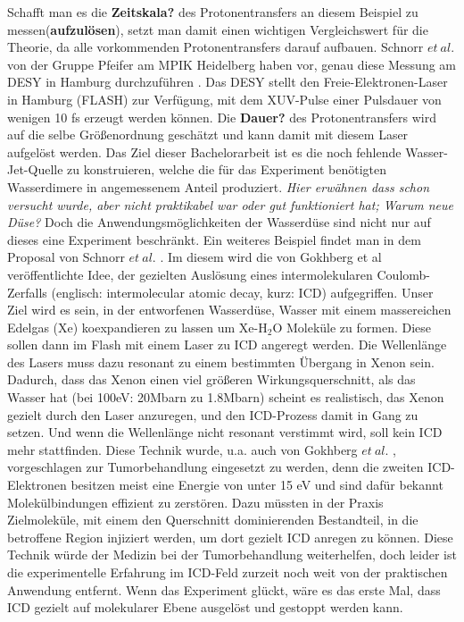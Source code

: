   Schafft man es die \textbf{Zeitskala?} des Protonentransfers an diesem Beispiel zu messen(\textbf{aufzulösen}), setzt man damit einen wichtigen Vergleichswert für die Theorie, da alle vorkommenden Protonentransfers darauf aufbauen. Schnorr $et\ al.$ von der Gruppe Pfeifer am MPIK Heidelberg haben vor, genau diese Messung am DESY in Hamburg durchzuführen \cite{SchPTD15}. Das DESY stellt den Freie-Elektronen-Laser in Hamburg (FLASH) zur Verfügung, mit dem XUV-Pulse einer Pulsdauer von wenigen 10 fs erzeugt werden können. Die \textbf{Dauer?} des Protonentransfers wird auf die selbe Größenordnung geschätzt und kann damit mit diesem Laser aufgelöst werden.
  Das Ziel dieser Bachelorarbeit ist es die noch fehlende Wasser-Jet-Quelle zu konstruieren, welche die für das Experiment benötigten Wasserdimere in angemessenem Anteil produziert. 
  \textit{Hier erwähnen dass schon versucht wurde, aber nicht praktikabel war oder gut funktioniert hat; Warum neue Düse?}
  Doch die Anwendungsmöglichkeiten der Wasserdüse sind nicht nur auf dieses eine Experiment beschränkt. Ein weiteres Beispiel findet man in dem Proposal von Schnorr $et\ al.$ \cite{SchICD15}. Im diesem wird die von Gokhberg et al \cite{gokhberg2014} veröffentlichte Idee, der gezielten Auslösung eines intermolekularen Coulomb-Zerfalls (englisch: intermolecular atomic decay, kurz: ICD) aufgegriffen. Unser Ziel wird es sein, in der entworfenen Wasserdüse, Wasser mit einem massereichen Edelgas (Xe) koexpandieren zu lassen um Xe-H$_2$O Moleküle zu formen. Diese sollen dann im Flash mit einem Laser zu ICD angeregt werden. Die Wellenlänge des Lasers muss dazu resonant zu einem bestimmten Übergang in Xenon sein. Dadurch, dass das Xenon einen viel größeren Wirkungsquerschnitt, als das Wasser hat (bei 100eV: 20Mbarn zu 1.8Mbarn) scheint es realistisch, das Xenon gezielt durch den Laser anzuregen, und den ICD-Prozess damit in Gang zu setzen. Und wenn die Wellenlänge nicht resonant verstimmt wird, soll kein ICD mehr stattfinden. Diese Technik wurde, u.a. auch von Gokhberg $et\ al.$ \cite{gokhberg2014}, vorgeschlagen zur Tumorbehandlung eingesetzt zu werden, denn die zweiten ICD-Elektronen besitzen meist eine Energie von unter 15 eV und sind dafür bekannt Molekülbindungen effizient zu zerstören.  Dazu müssten in der Praxis Zielmoleküle, mit einem den Querschnitt dominierenden Bestandteil, in die betroffene Region injiziert werden, um dort gezielt ICD anregen zu können. 
  Diese Technik würde der Medizin bei der Tumorbehandlung weiterhelfen, doch leider ist die experimentelle Erfahrung im ICD-Feld zurzeit noch weit von der praktischen Anwendung entfernt. Wenn das Experiment glückt, wäre es das erste Mal, dass ICD gezielt auf molekularer Ebene ausgelöst und gestoppt werden kann.
  

